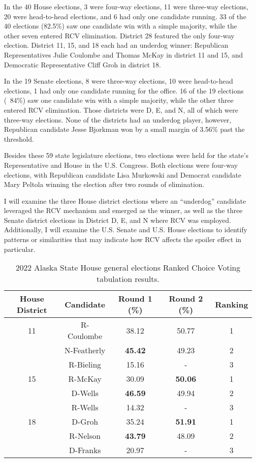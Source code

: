 \documentclass[12pt, a4paper, twoside]{article}
\begin{document}
In the 40 House elections, 3 were four-way elections, 11 were three-way elections, 20 were head-to-head elections, and 6 had only one candidate running. 33 of the 40 elections (82.5\%) saw one candidate win with a simple majority, while the other seven entered RCV elimination. District 28 featured the only four-way election. District 11, 15, and 18 each had an underdog winner: Republican Representatives Julie Coulombe and Thomas McKay in district 11 and 15, and Democratic Representative Cliff Groh in district 18. 

In the 19 Senate elections, 8 were three-way elections, 10 were head-to-head elections, 1 had only one candidate running for the office. 16 of the 19 elections (~84\%) saw one candidate win with a simple majority, while the other three entered RCV elimination. Those districts were D, E, and N, all of which were three-way elections. None of the districts had an underdog player, however, Republican candidate Jesse Bjorkman won by a small margin of 3.56\% past the threshold. 

Besides these 59 state legislature elections, two elections were held for the state’s Representative and House in the U.S. Congress. Both elections were four-way elections, with Republican candidate Lisa Murkowski and Democrat candidate Mary Peltola winning the election after two rounds of elimination. 

I will examine the three House district elections where an “underdog” candidate leveraged the RCV mechanism and emerged as the winner, as well as the three Senate district elections in District D, E, and N where RCV was employed. Additionally, I will examine the U.S. Senate and U.S. House elections to identify patterns or similarities that may indicate how RCV affects the spoiler effect in particular. 

\begin{table}[h!]
\centering
\begin{tabular}{|c|c|c|c|c|}
\hline
House District & Candidate & Round 1 (\%) & Round 2 (\%) & Ranking \\ \hline
11 & R-Coulombe & 38.12 & 50.77 & 1 \\ \hline
& N-Featherly & \textbf{45.42} & 49.23 & 2 \\ \hline
& R-Bieling & 15.16 & - & 3 \\ \hline
15 & R-McKay & 30.09 & \textbf{50.06} & 1 \\ \hline
& D-Wells & \textbf{46.59} & 49.94 & 2 \\ \hline
& R-Wells & 14.32 & - & 3 \\ \hline
18 & D-Groh & 35.24 & \textbf{51.91} & 1 \\ \hline
& R-Nelson & \textbf{43.79} & 48.09 & 2 \\ \hline
& D-Franks & 20.97 & - & 3 \\ \hline
\end{tabular}
\caption{2022 Alaska State House general elections Ranked Choice Voting tabulation results.}
\label{tab:2}
\end{table}
\end{document}
